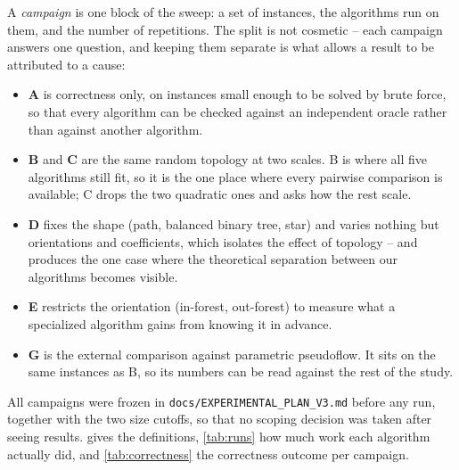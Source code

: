 \documentclass[11pt]{article}
\begin{document}
A \emph{campaign} is one block of the sweep: a set of instances, the
algorithms run on them, and the number of repetitions. The split is not
cosmetic -- each campaign answers one question, and keeping them separate is
what allows a result to be attributed to a cause:

\begin{itemize}
  \item \textbf{A} is correctness only, on instances small enough to be
  solved by brute force, so that every algorithm can be checked against an
  independent oracle rather than against another algorithm.
  \item \textbf{B} and \textbf{C} are the same random topology at two scales.
  B is where all five algorithms still fit, so it is the one place where every
  pairwise comparison is available; C drops the two quadratic ones and asks how
  the rest scale.
  \item \textbf{D} fixes the shape (path, balanced binary tree, star) and
  varies nothing but orientations and coefficients, which isolates the effect
  of topology -- and produces the one case where the theoretical separation
  between our algorithms becomes visible.
  \item \textbf{E} restricts the orientation (in-forest, out-forest) to
  measure what a specialized algorithm gains from knowing it in advance.
  \item \textbf{G} is the external comparison against parametric pseudoflow.
  It sits on the same instances as B, so its numbers can be read against the
  rest of the study.
\end{itemize}

\noindent
All campaigns were frozen in \texttt{docs/EXPERIMENTAL\_PLAN\_V3.md} before any
run, together with the two size cutoffs, so that no scoping decision was taken
after seeing results.  gives the definitions,
\cref{tab:runs} how much work each algorithm actually did, and
\cref{tab:correctness} the correctness outcome per campaign.
\end{document}
